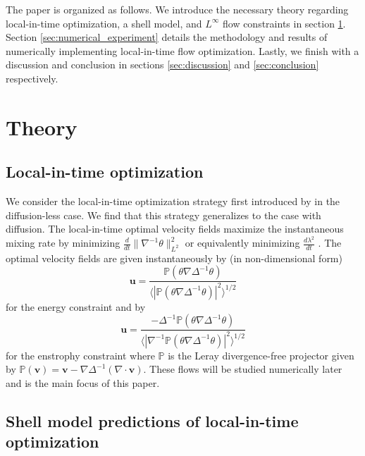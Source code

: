 \documentclass{jfm}
\newcommand{\ddt}[1]{\frac{d #1}{dt}}
\newcommand{\hmone}[1]{\|\nabla^{-1} #1\|_{L^{2}}}
\renewcommand{\vec}[1]{\mathbf{#1}}
\newcommand{\invlap}{\Delta^{-1}}
\begin{document}
The paper is organized as follows. We introduce the necessary theory regarding local-in-time optimization, a shell model, and $L^{\infty}$ flow constraints in section \ref{sec:theory}. Section \ref{sec:numerical_experiment} details the methodology and results of numerically implementing local-in-time flow optimization. Lastly, we finish with a discussion and conclusion in sections \ref{sec:discussion} and \ref{sec:conclusion} respectively.

\section{Theory}
\label{sec:theory}
\subsection{Local-in-time optimization}
We consider the local-in-time optimization strategy first introduced by \cite{JFM2011} in the diffusion-less case. We find that this strategy generalizes to the case with diffusion. The local-in-time optimal velocity fields maximize the instantaneous mixing rate by minimizing $\ddt{}\hmone{\theta}^2$ or equivalently minimizing $\ddt{\lambda^2}$ . The optimal velocity fields are given instantaneously by (in non-dimensional form)
%
\begin{equation}
\mathbf{u}= \frac{\mathds{P}(\theta \nabla \invlap\theta)}{\langle |\mathds{P}(\theta \nabla \invlap\theta)|^2\rangle^{1/2}}
\end{equation} 
%
for the energy constraint and by 
%
\begin{equation}
\mathbf{u}= \frac{-\invlap\mathds{P}(\theta \nabla \invlap\theta)}{\langle |\nabla^{-1}\mathds{P}(\theta \nabla \invlap\theta)|^2\rangle^{1/2}}
\end{equation}
%
for the enstrophy constraint where $\mathds{P}$ is the Leray divergence-free projector given by $\mathds{P}(\vec{v}) = \vec{v} - \nabla \Delta^{-1}(\nabla \cdot \vec{v})$. These flows will be studied numerically later and is the main focus of this paper.


\subsection{Shell model predictions of local-in-time optimization}
\end{document}
